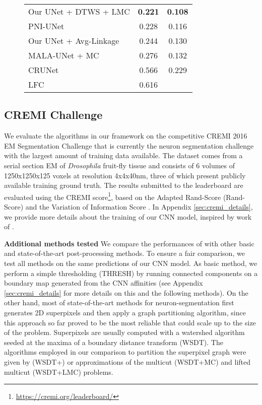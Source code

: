 \begin{figure}
\begin{minipage}[T]{0.48\textwidth}
\begin{tabular}{l|c|c}
Our UNet + DTWS + LMC &  \textbf{0.221} & \textbf{0.108}\\
PNI-UNet & 0.228 & 0.116 \\
Our UNet + \algname{} Avg-Linkage & 0.244 & 0.130 \\
MALA-UNet + MC \cite{funke2018large} & 0.276 & 0.132 \\
CRUNet \cite{zeng2017deepem3d} & 0.566 & 0.229 \\
LFC \cite{parag2017anisotropic} & 0.616 & \\
        \end{tabular}
    \label{tab:results_cremi_test}
\end{minipage}
\end{figure}

\subsection{CREMI Challenge} \label{sec:cremi_challenge}
We evaluate the algorithms in our framework on the competitive CREMI 2016 EM Segmentation Challenge \cite{cremiChallenge} that is currently the neuron segmentation challenge with the largest amount of training data available. The dataset comes from a serial section EM of \emph{Drosophila} fruit-fly tissue and consists of 6 volumes of 1250x1250x125 voxels at resolution 4x4x40nm, three of which present publicly available training ground truth. The results submitted to the leaderboard are evaluated using the CREMI score\footnote{\url{https://cremi.org/leaderboard/}}, based on the Adapted Rand-Score (Rand-Score) and the Variation of Information Score \cite{arganda2015crowdsourcing}. In Appendix \ref{sec:cremi_details}, we provide more details about the training of our CNN model, inspired by work of \cite{lee2017superhuman,funke2018large}.


\textbf{Additional methods tested } We compare the performances of \algname{} with other basic and state-of-the-art post-processing methods. To ensure a fair comparison, we test all methods on the same predictions of our CNN model. As basic method, we perform a simple thresholding (THRESH) by running connected components on a boundary map generated from the CNN affinities (see Appendix \ref{sec:cremi_details} for more details on this and the following methods). On the other hand, most of state-of-the-art methods for neuron-segmentation first generates 2D superpixels and then apply a graph partitioning algorithm, since this approach so far proved to be the most reliable that could scale up to the size of the problem. Superpixels are usually computed with a watershed algorithm seeded at the maxima of a boundary distance transform (WSDT). The algorithms employed in our comparison to partition the superpixel graph were given by \TODO{\algname{}} (WSDT+\algname{}) or approximations of the multicut (WSDT+MC) and lifted multicut (WSDT+LMC) problems.


